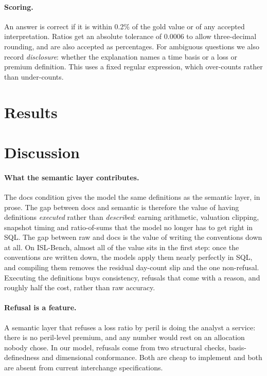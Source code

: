 \documentclass[11pt]{article}
\newcommand{\DiscussionGaps}{On ISL-Bench, almost all of the value sits in the first step: once the conventions are
written down, the models apply them nearly perfectly in SQL, and compiling them removes the residual day-count
slip and the one non-refusal. Executing the definitions buys consistency, refusals that come with a reason,
and roughly half the cost, rather than raw accuracy.}
\begin{document}
\paragraph{Scoring.}
An answer is correct if it is within 0.2\% of the gold value or of any accepted interpretation. Ratios get an
absolute tolerance of 0.0006 to allow three-decimal rounding, and are also accepted as percentages. For ambiguous
questions we also record \emph{disclosure}: whether the explanation names a time basis or a loss or premium
definition. This uses a fixed regular expression, which over-counts rather than under-counts.

\section{Results}\label{sec:results}



\section{Discussion}\label{sec:discussion}

\paragraph{What the semantic layer contributes.}
The docs condition gives the model the same definitions as the semantic layer, in prose. The gap between docs
and semantic is therefore the value of having definitions \emph{executed} rather than \emph{described}: earning
arithmetic, valuation clipping, snapshot timing and ratio-of-sums that the model no longer has to get right in SQL.
The gap between raw and docs is the value of writing the conventions down at all. \DiscussionGaps{}

\paragraph{Refusal is a feature.}
A semantic layer that refuses a loss ratio by peril is doing the analyst a service: there is no peril-level
premium, and any number would rest on an allocation nobody chose. In our model, refusals come from two
structural checks, basis-definedness and dimensional conformance. Both are cheap to implement and both are absent
from current interchange specifications.
\end{document}
